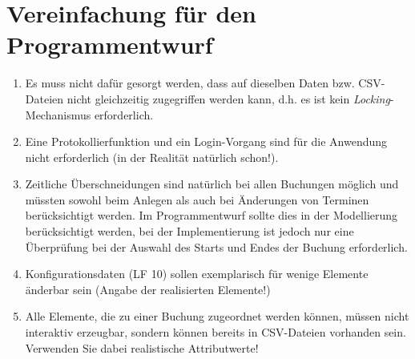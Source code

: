 \chapter{Vereinfachung für den Programmentwurf}

\begin{enumerate}
    \item Es muss nicht dafür gesorgt werden, dass auf dieselben Daten bzw. CSV-Dateien nicht gleichzeitig zugegriffen werden kann, d.h. es ist kein \emph{Locking}-Mechanismus erforderlich.  
    \item Eine Protokollierfunktion und ein Login-Vorgang sind für die Anwendung nicht erforderlich (in der Realität natürlich schon!). 
    \item Zeitliche Überschneidungen sind natürlich bei allen Buchungen möglich und müssten sowohl beim Anlegen als auch bei Änderungen von Terminen berücksichtigt werden. Im Programmentwurf sollte dies in der Modellierung berücksichtigt werden, bei der Implementierung ist jedoch nur eine Überprüfung bei der Auswahl des Starts und Endes der Buchung erforderlich. 
    \item Konfigurationsdaten (LF 10) sollen exemplarisch für wenige Elemente änderbar sein (Angabe der realisierten Elemente!) 
    \item Alle Elemente, die zu einer Buchung zugeordnet werden können, müssen nicht interaktiv erzeugbar, sondern können bereits in CSV-Dateien vorhanden sein. Verwenden Sie dabei realistische Attributwerte! 
\end{enumerate}